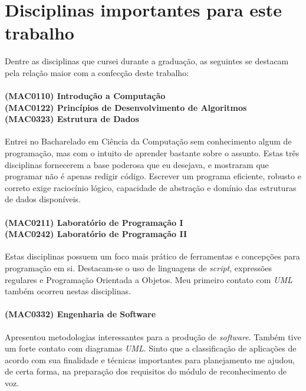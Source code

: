 \chapter*{Disciplinas importantes para este trabalho}

Dentre as disciplinas que cursei durante a graduação, as seguintes se destacam pela relação maior com a confecção deste trabalho:

\subsubsection{(MAC0110) Introdução a Computação \\
(MAC0122) Princípios de Desenvolvimento de Algoritmos \\
(MAC0323) Estrutura de Dados}

Entrei no Bacharelado em Ciência da Computação sem conhecimento algum de programação, mas com o intuito de aprender bastante sobre o assunto. Estas três disciplinas fornecerem a base poderosa que eu desejava, e mostraram que programar não é apenas redigir código. Escrever um programa eficiente, robusto e correto exige raciocínio lógico, capacidade de abstração e domínio das estruturas de dados disponíveis.

\subsubsection{(MAC0211) Laboratório de Programação I \\
(MAC0242) Laboratório de Programação II}

Estas disciplinas possuem um foco mais prático de ferramentas e concepções para programação em si. Destacam-se o uso de linguagens de \textit{script}, expressões regulares e Programação Orientada a Objetos. Meu primeiro contato com \textit{UML} também ocorreu nestas disciplinas.

\subsubsection{(MAC0332) Engenharia de Software}

Apresentou metodologias interessantes para a produção de \textit{software}. Também tive um forte contato com diagramas \textit{UML}. Sinto que a classificação de aplicações de acordo com sua finalidade e técnicas importantes para planejamento me ajudou, de certa forma, na preparação dos requisitos do módulo de reconhecimento de voz.

